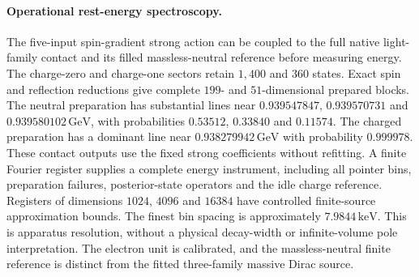 \paragraph{Operational rest-energy spectroscopy.}
The five-input spin-gradient strong action can be coupled to the full native
light-family contact and its filled massless-neutral reference before
measuring energy. The charge-zero and charge-one sectors retain $1{,}400$
and $360$ states. Exact spin and reflection reductions give complete
$199$- and $51$-dimensional prepared blocks.
The neutral preparation has substantial lines near
$0.939547847$, $0.939570731$ and $0.939580102\,\mathrm{GeV}$,
with probabilities $0.53512$, $0.33840$ and $0.11574$.
The charged preparation has a dominant line near
$0.938279942\,\mathrm{GeV}$ with probability $0.999978$.
These contact outputs use the fixed strong coefficients without refitting.
A finite Fourier register supplies a complete energy instrument, including
all pointer bins, preparation failures, posterior-state operators and the
idle charge reference. Registers of dimensions $1024$, $4096$ and $16384$
have controlled finite-source approximation bounds. The finest bin spacing
is approximately $7.9844\,\mathrm{keV}$.
This is apparatus resolution, without a physical decay-width or
infinite-volume pole interpretation. The electron unit is calibrated, and
the massless-neutral finite reference is distinct from the fitted
three-family massive Dirac source.

